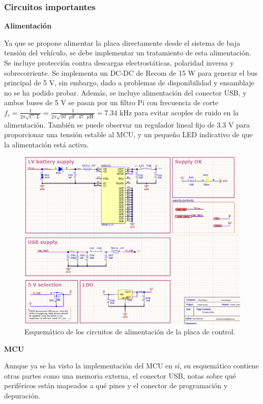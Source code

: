 \subsubsection{Circuitos importantes}

\textbf{Alimentación}

Ya que se propone alimentar la placa directamente desde el sistema de baja tensión del vehículo, se debe implementar un tratamiento de esta alimentación. Se incluye protección contra descargas electrostáticas, polaridad inversa y sobrecorriente. Se implementa un DC-DC de Recom de 15 W para generar el bus principal de 5 V, sin embargo, dado a problemas de disponibilidad y ensamblaje no se ha podido probar. Además, se incluye alimentación del conector USB, y ambos buses de 5 V se pasan por un filtro Pi con frecuencia de corte $f_c = \frac{1}{2 \pi \sqrt{C \cdot L}} = \frac{1}{2 \pi \sqrt{10\text{ }\mu\text{F} \cdot 47\text{ }\mu\text{H}}} = 7.34 \text{ kHz}$ para evitar acoples de ruido en la alimentación. También se puede observar un regulador lineal fijo de 3.3 V para proporcionar una tensión estable al MCU, y un pequeño LED indicativo de que la alimentación está activa.

\begin{figure}[H]
	\centering
	\includegraphics[width=0.7\linewidth]{fig/schSUPPcontrol}
	\caption{Esquemático de los circuitos de alimentación de la placa de control.}
\end{figure}

\textbf{MCU}

Aunque ya se ha visto la implementación del MCU en sí, su esquemático contiene otras partes como una memoria externa, el conector USB, notas sobre qué periféricos están mapeados a qué pines y el conector de programación y depuración.

